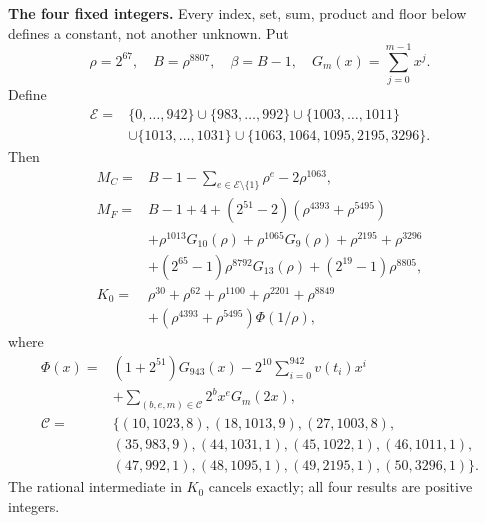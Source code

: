 \begingroup
\newcommand{\fixedrange}[2]{\{#1,\ldots,#2\}}
\newcommand{\fixedfloor}[1]{\left\lfloor#1\right\rfloor}
\textbf{The four fixed integers.}
Every index, set, sum, product and floor below defines a constant, not
another unknown. Put
\[
\rho=2^{67},\quad B=\rho^{8807},\quad\beta=B-1,\quad
G_m(x)=\sum_{j=0}^{m-1}x^j.
\]
Define
\[
\begin{split}
\mathcal E={}&\fixedrange0{942}\cup\fixedrange{983}{992}\cup\fixedrange{1003}{1011}\\
&\cup\fixedrange{1013}{1031}\cup\{1063,1064,1095,2195,3296\}.
\end{split}
\]
Then
\begin{align*}
M_C={}&B-1-\sum_{e\in\mathcal E\setminus\{1\}}\rho^e-2\rho^{1063},\\
M_F={}&B-1+4+(2^{51}-2)(\rho^{4393}+\rho^{5495})\\
&+\rho^{1013}G_{10}(\rho)+\rho^{1065}G_9(\rho)
  +\rho^{2195}+\rho^{3296}\\
&+(2^{65}-1)\rho^{8792}G_{13}(\rho)+(2^{19}-1)\rho^{8805},\\
K_0={}&\rho^{30}+\rho^{62}+\rho^{1100}+\rho^{2201}+\rho^{8849}\\
&+(\rho^{4393}+\rho^{5495})\Phi(1/\rho),
\end{align*}
where
\[
\begin{split}
\Phi(x)={}&(1+2^{51})G_{943}(x)
 -2^{10}\sum_{i=0}^{942}v(t_i)x^i\\
&+\sum_{(b,e,m)\in\mathcal C}2^b x^e G_m(2x),\\
\mathcal C={}&\{(10,1023,8),(18,1013,9),(27,1003,8),\\
&(35,983,9),(44,1031,1),(45,1022,1),(46,1011,1),\\
&(47,992,1),(48,1095,1),(49,2195,1),(50,3296,1)\}.
\end{split}
\]
The rational intermediate in $K_0$ cancels exactly; all four results are positive integers.

